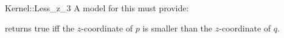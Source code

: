 \begin{ccRefFunctionObjectConcept}{Kernel::Less_z_3}
A model for this must provide:


{returns true iff the $z$-coordinate of $p$ is smaller than the
$z$-coordinate of $q$.}

\end{ccRefFunctionObjectConcept}
